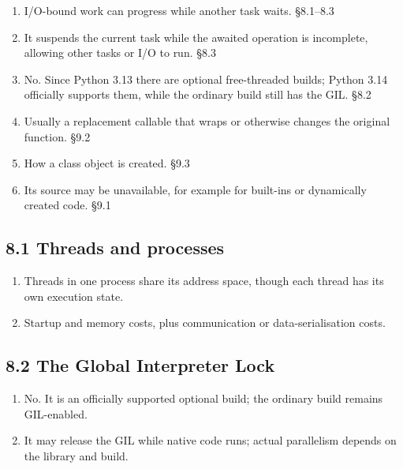 \documentclass[11pt]{article}
\begin{document}
\begin{keepsection}
\begin{keepsection}
\begin{enumerate}
\item I/O-bound work can progress while another task waits. \hfill{\small\color{FAUblue}§8.1–8.3}
\item It suspends the current task while the awaited operation is incomplete, allowing other tasks or I/O to run. \hfill{\small\color{FAUblue}§8.3}
\item No. Since Python 3.13 there are optional free-threaded builds; Python 3.14 officially supports them, while the ordinary build still has the GIL. \hfill{\small\color{FAUblue}§8.2}
\item Usually a replacement callable that wraps or otherwise changes the original function. \hfill{\small\color{FAUblue}§9.2}
\item How a class object is created. \hfill{\small\color{FAUblue}§9.3}
\item Its source may be unavailable, for example for built-ins or dynamically created code. \hfill{\small\color{FAUblue}§9.1}
\end{enumerate}

\end{keepsection}
\begin{keepsection}\subsection{8.1 Threads and processes}

\begin{enumerate}
\item Threads in one process share its address space, though each thread has its own execution state.
\item Startup and memory costs, plus communication or data-serialisation costs.
\end{enumerate}

\end{keepsection}
\begin{keepsection}\subsection{8.2 The Global Interpreter Lock}

\begin{enumerate}
\item No. It is an officially supported optional build; the ordinary build remains GIL-enabled.
\item It may release the GIL while native code runs; actual parallelism depends on the library and build.
\end{enumerate}


\end{keepsection}
\end{keepsection}
\end{document}

